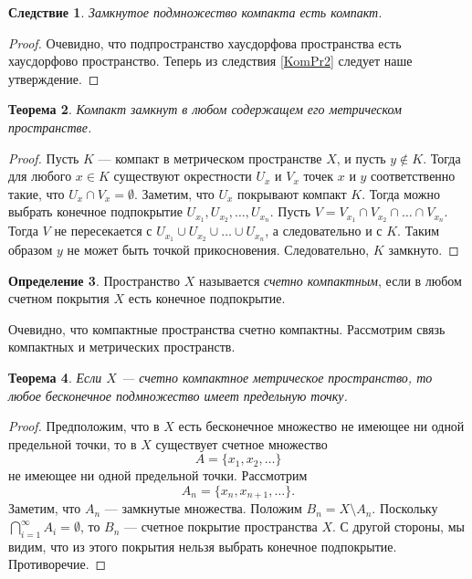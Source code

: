 \documentclass[12pt, titlepage, oneside]{amsbook}
\newtheorem{theorem}{Теорема}[chapter]
\newtheorem{corollary}[theorem]{Следствие}
\theoremstyle{definition}
\newtheorem{definition}[theorem]{Определение}
\theoremstyle{remark}
\begin{document}
\begin{corollary}
	\label{KomPr3}
	Замкнутое подмножество компакта есть компакт.
\end{corollary}

\begin{proof}
	Очевидно, что подпространство хаусдорфова пространства есть хаусдорфово пространство. Теперь из следствия \ref{KomPr2} следует наше утверждение.
\end{proof}

\begin{theorem}
	\label{KomPr4}
	Компакт замкнут в любом содержащем его метрическом пространстве.
\end{theorem}

\begin{proof}
	Пусть $K$ --- компакт в метрическом пространстве $X$, и пусть $y\not\in K$. Тогда для любого $x\in K$ существуют окрестности $U_x$ и $V_x$ точек $x$ и $y$ соответственно такие, что $U_x\cap V_x=\emptyset$. Заметим, что $U_x$ покрывают компакт $K$. Тогда можно выбрать конечное подпокрытие $U_{x_1},U_{x_2},\ldots, U_{x_n}$. Пусть $V=V_{x_1}\cap V_{x_2}\cap\ldots\cap V_{x_n}$. Тогда $V$ не пересекается с $U_{x_1}\cup U_{x_2}\cup\ldots\cup U_{x_n}$, а следовательно и с $K$. Таким образом $y$ не может быть точкой прикосновения. Следовательно, $K$ замкнуто.
\end{proof}

\begin{definition}
	Пространство $X$ называется \emph{счетно компактным}, если в любом счетном покрытия $X$ есть конечное подпокрытие.
\end{definition}

Очевидно, что компактные пространства счетно компактны. Рассмотрим связь компактных и метрических пространств.

\begin{theorem}
	\label{KomPr5}
	Если $X$ --- счетно компактное метрическое пространство, то любое бесконечное подмножество имеет предельную точку.
\end{theorem}

\begin{proof}
	Предположим, что в $X$ есть бесконечное множество не имеющее ни одной предельной точки, то в $X$ существует счетное множество $$A=\{x_1,x_2,\ldots\}$$ не имеющее ни одной предельной точки. Рассмотрим $$A_n=\{x_{n},x_{n+1},\ldots\}.$$ Заметим, что $A_n$ --- замкнутые множества. Положим $B_n=X\setminus A_n$. Поскольку $\bigcap\limits_{i=1}^{\infty} A_i=\emptyset$, то $B_n$ --- счетное покрытие пространства $X$. С другой стороны, мы видим, что из этого покрытия нельзя выбрать конечное подпокрытие. Противоречие.
\end{proof}
\end{document}
